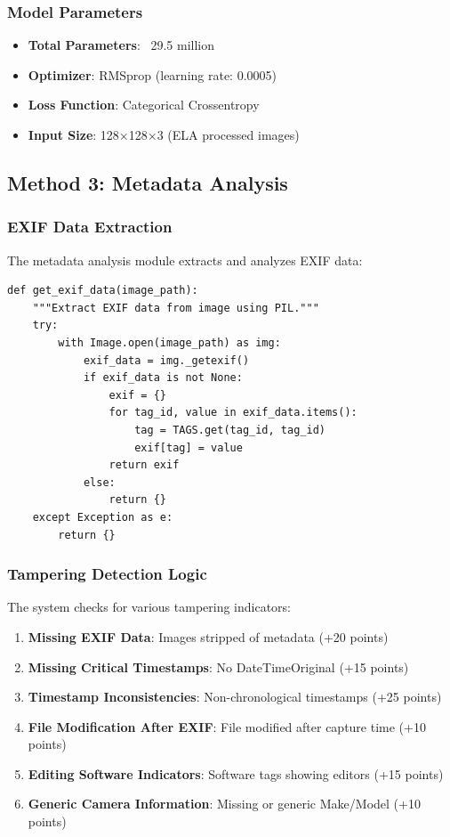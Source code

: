 \documentclass[12pt,a4paper]{article}
\begin{document}
\subsubsection{Model Parameters}
\begin{itemize}
    \item \textbf{Total Parameters}: ~29.5 million
    \item \textbf{Optimizer}: RMSprop (learning rate: 0.0005)
    \item \textbf{Loss Function}: Categorical Crossentropy
    \item \textbf{Input Size}: 128×128×3 (ELA processed images)
\end{itemize}

\subsection{Method 3: Metadata Analysis}

\subsubsection{EXIF Data Extraction}
The metadata analysis module extracts and analyzes EXIF data:

\begin{lstlisting}[caption=EXIF Data Extraction]
def get_exif_data(image_path):
    """Extract EXIF data from image using PIL."""
    try:
        with Image.open(image_path) as img:
            exif_data = img._getexif()
            if exif_data is not None:
                exif = {}
                for tag_id, value in exif_data.items():
                    tag = TAGS.get(tag_id, tag_id)
                    exif[tag] = value
                return exif
            else:
                return {}
    except Exception as e:
        return {}
\end{lstlisting}

\subsubsection{Tampering Detection Logic}
The system checks for various tampering indicators:

\begin{enumerate}
    \item \textbf{Missing EXIF Data}: Images stripped of metadata (+20 points)
    \item \textbf{Missing Critical Timestamps}: No DateTimeOriginal (+15 points)
    \item \textbf{Timestamp Inconsistencies}: Non-chronological timestamps (+25 points)
    \item \textbf{File Modification After EXIF}: File modified after capture time (+10 points)
    \item \textbf{Editing Software Indicators}: Software tags showing editors (+15 points)
    \item \textbf{Generic Camera Information}: Missing or generic Make/Model (+10 points)
\end{enumerate}
\end{document}

